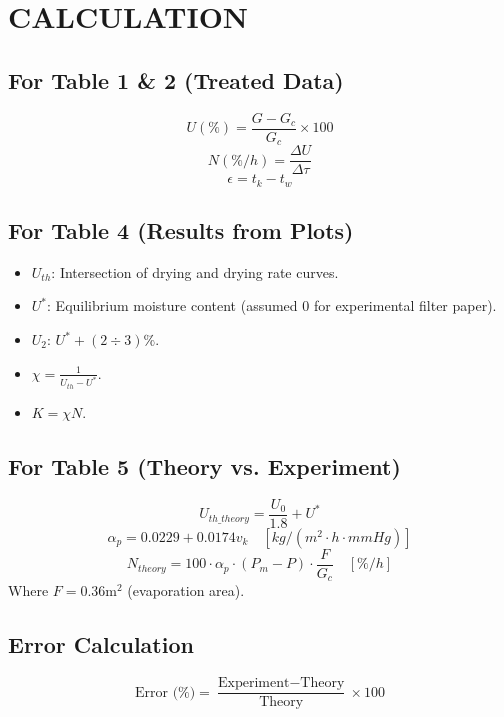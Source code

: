 \section{CALCULATION}
\subsection{For Table 1 \& 2 (Treated Data)}
\begin{equation}
    U(\%) = \frac{G - G_c}{G_c} \times 100
\end{equation}
\begin{equation}
    N(\%/h) = \frac{\Delta U}{\Delta \tau}
\end{equation}
\begin{equation}
    \epsilon = t_k - t_w
\end{equation}

\subsection{For Table 4 (Results from Plots)}
\begin{itemize}
    \item $U_{th}$: Intersection of drying and drying rate curves.
    \item $U^*$: Equilibrium moisture content (assumed 0 for experimental filter paper).
    \item $U_2$: $U^* + (2 \div 3)\%$.
    \item $\chi = \frac{1}{U_{th} - U^*}$.
    \item $K = \chi N$.
\end{itemize}

\subsection{For Table 5 (Theory vs. Experiment)}
\begin{equation}
    U_{th\_theory} = \frac{U_0}{1.8} + U^*
\end{equation}
\begin{equation}
    \alpha_p = 0.0229 + 0.0174v_k \quad [kg/(m^2 \cdot h \cdot mmHg)]
\end{equation}
\begin{equation}
    N_{theory} = 100 \cdot \alpha_p \cdot (P_m - P) \cdot \frac{F}{G_c} \quad [\%/h]
\end{equation}
Where $F = 0.36\text{m}^2$ (evaporation area).

\subsection{Error Calculation}
\begin{equation}
    \text{Error (\%)} = \frac{\text{Experiment} - \text{Theory}}{\text{Theory}} \times 100
\end{equation}

